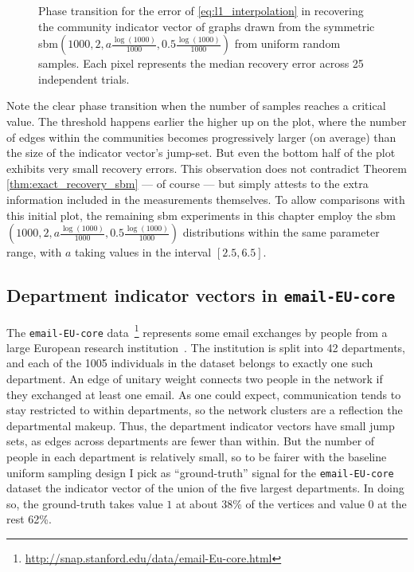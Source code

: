 \begin{figure}[ht]
    \centering
    \hfill
    \caption[Phase transition of the recovery error in 2-\texttt{SSBM}(500~+~500) graphs]{Phase transition for the error of \eqref{eq:l1_interpolation} in recovering the community indicator vector of graphs drawn from the symmetric \acrshort{sbm}$\left(1000, 2, a \frac{\log (1000)}{1000}, 0.5 \frac{\log (1000)}{1000}\right)$ from uniform random samples. Each pixel represents the median recovery error across 25 independent trials.}
    \label{fig:pt_2ssbm_unif_samp_tv_interp_with_thresholds}
\end{figure}

Note the clear phase transition when the number of samples reaches a critical value. The threshold happens earlier the higher up on the plot, where the number of edges within the communities becomes progressively larger (on average) than the size of the indicator vector's jump-set. But even the bottom half of the plot exhibits very small recovery errors. This observation does not contradict Theorem \ref{thm:exact_recovery_sbm} --- of course --- but simply attests to the extra information included in the measurements themselves. To allow comparisons with this initial plot, the remaining \acrshort{sbm} experiments in this chapter employ the \acrshort{sbm}$\left(1000, 2, a \frac{\log (1000)}{1000}, 0.5 \frac{\log (1000)}{1000}\right)$ distributions within the same parameter range, \ie with $a$ taking values in the interval $[2.5, 6.5]$.

\subsection{Department indicator vectors in \texttt{email-EU-core}}

The \texttt{email-EU-core} data~\footnote{\url{http://snap.stanford.edu/data/email-Eu-core.html}} represents some email exchanges by people from a large European research institution~\cite{yin2017}. The institution is split into 42 departments, and each of the 1005 individuals in the dataset belongs to exactly one such department. An edge of unitary weight connects two people in the network if they exchanged at least one email. As one could expect, communication tends to stay restricted to within departments, so the network clusters are a reflection the departmental makeup. Thus, the department indicator vectors have small jump sets, as edges across departments are fewer than within. But the number of people in each department is relatively small, so to be fairer with the baseline uniform sampling design I pick as ``ground-truth'' signal for the \texttt{email-EU-core} dataset the indicator vector of the union of the five largest departments. In doing so, the ground-truth takes value $1$ at about 38\% of the vertices and value $0$ at the rest 62\%.

